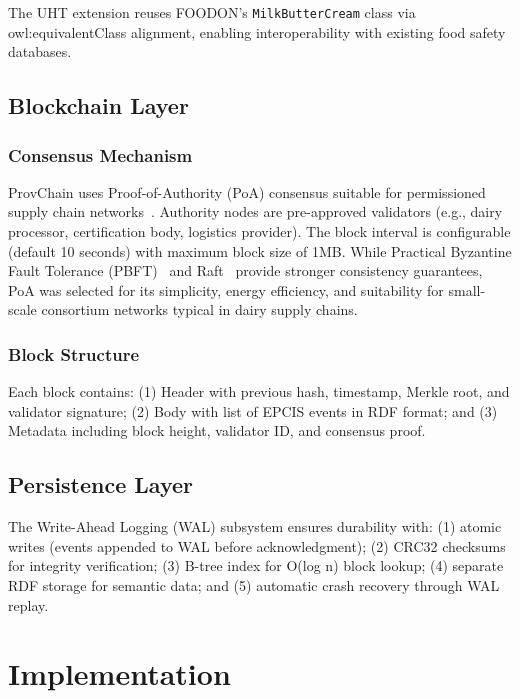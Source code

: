 \documentclass[preprint,review,12pt,authoryear]{elsarticle}
\begin{document}
The UHT extension reuses FOODON's \texttt{MilkButterCream} class via owl:equivalentClass alignment, enabling interoperability with existing food safety databases.

\subsection{Blockchain Layer}

\subsubsection{Consensus Mechanism}

ProvChain uses Proof-of-Authority (PoA) consensus suitable for permissioned supply chain networks~\cite{nakamoto2008bitcoin}. Authority nodes are pre-approved validators (e.g., dairy processor, certification body, logistics provider). The block interval is configurable (default 10 seconds) with maximum block size of 1MB. While Practical Byzantine Fault Tolerance (PBFT)~\cite{castro1999practical} and Raft~\cite{lamport1998part} provide stronger consistency guarantees, PoA was selected for its simplicity, energy efficiency, and suitability for small-scale consortium networks typical in dairy supply chains.

\subsubsection{Block Structure}

Each block contains: (1) Header with previous hash, timestamp, Merkle root, and validator signature; (2) Body with list of EPCIS events in RDF format; and (3) Metadata including block height, validator ID, and consensus proof.

\subsection{Persistence Layer}

The Write-Ahead Logging (WAL) subsystem ensures durability with: (1) atomic writes (events appended to WAL before acknowledgment); (2) CRC32 checksums for integrity verification; (3) B-tree index for O(log n) block lookup; (4) separate RDF storage for semantic data; and (5) automatic crash recovery through WAL replay.

\section{Implementation}\label{sec:implementation}
\end{document}
